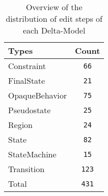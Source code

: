 \begin{table} 
 \center 
 \small 
\begin{tabular}{|l|c|}
\hline
Types & Count\\ 
  \hline 
Constraint & \texttt{66}\\ 
  \hline 
FinalState & \texttt{21}\\ 
  \hline 
OpaqueBehavior & \texttt{75}\\ 
  \hline 
Pseudostate & \texttt{25}\\ 
  \hline 
Region & \texttt{24}\\ 
  \hline 
State & \texttt{82}\\ 
  \hline 
StateMachine & \texttt{15}\\ 
  \hline 
Transition & \texttt{123}\\ 
  \hline 
Total & \texttt{431}\\ 
  \hline 
\end{tabular}
\caption[Overview: Delta-Models]{Overview of the distribution of edit steps of each Delta-Model}
\end{table}

